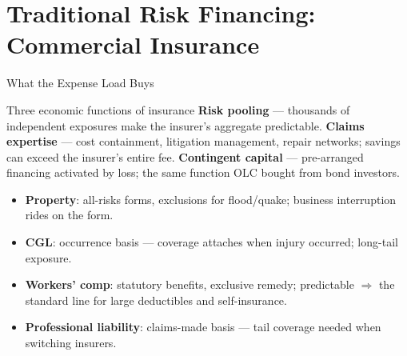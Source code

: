 \documentclass[11pt, aspectratio=169]{beamer}
\begin{document}
\section{Traditional Risk Financing: Commercial Insurance}

\begin{frame}{What the Expense Load Buys}
\begin{block}{Three economic functions of insurance}
\textbf{Risk pooling} --- thousands of independent exposures make the insurer's aggregate predictable. \quad
\textbf{Claims expertise} --- cost containment, litigation management, repair networks; savings can exceed the insurer's entire fee. \quad
\textbf{Contingent capital} --- pre-arranged financing activated by loss; the same function OLC bought from bond investors.
\end{block}
\medskip
\begin{itemize}
  \item \textbf{Property}: all-risks forms, exclusions for flood/quake; business interruption rides on the form.
  \item \textbf{CGL}: \alert{occurrence} basis --- coverage attaches when injury occurred; long-tail exposure.
  \item \textbf{Workers' comp}: statutory benefits, exclusive remedy; predictable $\Rightarrow$ the standard line for large deductibles and self-insurance.
  \item \textbf{Professional liability}: \alert{claims-made} basis --- tail coverage needed when switching insurers.
\end{itemize}
\end{frame}
\end{document}
